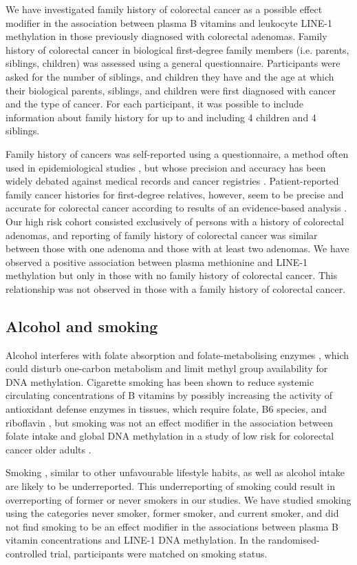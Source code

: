 \noindent We have investigated family history of colorectal cancer as a possible effect modifier in the association between plasma B vitamins and leukocyte LINE-1 methylation in those previously diagnosed with colorectal adenomas. Family history of colorectal cancer in biological first-degree family members (i.e. parents, siblings, children) was assessed using a general questionnaire. Participants were asked for the number of siblings, and children they have and the age at which their biological parents, siblings, and children were first diagnosed with cancer and the type of cancer. For each participant, it was possible to include information about family history for up to and including 4 children and 4 siblings. 
 
\noindent Family history of cancers was self-reported using a questionnaire, a method often used in epidemiological studies \cite{c773,c774}, but whose precision and accuracy has been widely debated against medical records and cancer registries \cite{c775,c776,c777}. Patient-reported family cancer histories for first-degree relatives, however, seem to be precise and accurate for colorectal cancer according to results of an evidence-based analysis \cite{c778}. Our high risk cohort consisted exclusively of persons with a history of colorectal adenomas, and reporting of family history of colorectal cancer was similar between those with one adenoma and those with at least two adenomas. We have observed a positive association between plasma methionine and LINE-1 methylation but only in those with no family history of colorectal cancer. This relationship was not observed in those with a family history of colorectal cancer. 
 
\subsection{Alcohol and smoking} %
\noindent Alcohol interferes with folate absorption and folate-metabolising enzymes \cite{c779}, which could disturb one-carbon metabolism and limit methyl group availability for DNA methylation. Cigarette smoking has been shown to reduce systemic circulating concentrations of B vitamins by possibly increasing the activity of antioxidant defense enzymes in tissues, which require folate, B6 species, and riboflavin \cite{c780}, but smoking was not an effect modifier in the association between folate intake and global DNA methylation in a study of low risk for colorectal cancer older adults \cite{c79}. 
 
\noindent Smoking \cite{c781}, similar to other unfavourable lifestyle habits, as well as alcohol intake \cite{c782} are likely to be underreported. This underreporting of smoking could result in overreporting of former or never smokers in our studies. We have studied smoking using the categories never smoker, former smoker, and current smoker, and did not find smoking to be an effect modifier in the associations between plasma B vitamin concentrations and LINE-1 DNA methylation. In the randomised-controlled trial, participants were matched on smoking status. 
 
